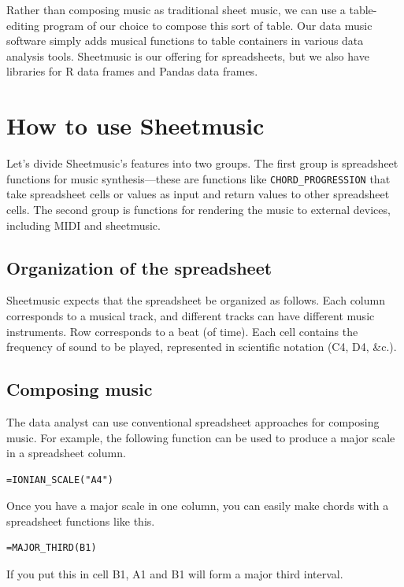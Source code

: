 \documentclass{acm_proc_article-sp}
\begin{document}
Rather than composing music as traditional sheet music,
we can use a table-editing program of our choice to compose
this sort of table. Our data music software simply adds
musical functions to table containers in various data analysis
tools. Sheetmusic is our offering for spreadsheets, but we
also have libraries for R data frames\cite{ddr} and Pandas
data frames.\cite{ddpy}

\section{How to use Sheetmusic}
Let's divide Sheetmusic's features into two groups. The first group
is spreadsheet functions for music synthesis---these are functions
like \texttt{CHORD\_PROGRESSION} that take spreadsheet cells or values
as input and return values to other spreadsheet cells. The second
group is functions for rendering the music to external devices,
including MIDI and sheetmusic.

\subsection{Organization of the spreadsheet}
Sheetmusic expects that the spreadsheet be organized as follows.
Each column corresponds
to a musical track, and different tracks can have different music instruments.
Row corresponds to a beat (of time).
Each cell contains the frequency of sound to be played, represented
in scientific notation (C4, D4, \&c.).

\subsection{Composing music}
The data analyst can use conventional spreadsheet approaches for
composing music. For example, the following function can be used
to produce a major scale in a spreadsheet column.

\begin{verbatim}
=IONIAN_SCALE("A4")
\end{verbatim}

Once you have a major scale in one column, you can easily make
chords with a spreadsheet functions like this.
\begin{verbatim}
=MAJOR_THIRD(B1)
\end{verbatim}
If you put this in cell B1, A1 and B1 will form a major third interval.
\end{document}
